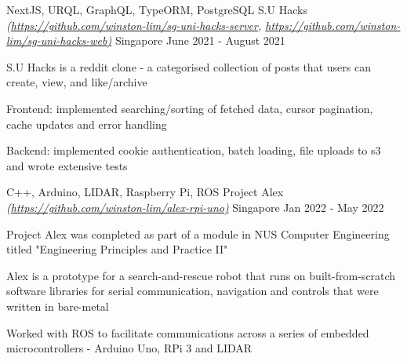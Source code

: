 

\begin{cventries}
  \cventry
  {NextJS, URQL, GraphQL, TypeORM, PostgreSQL} %
  {S.U Hacks \textmd{\em\tiny(\url{https://github.com/winston-lim/sg-uni-hacks-server}, \url{https://github.com/winston-lim/sg-uni-hacks-web)}}} %
  {Singapore} %
  {June 2021 - August 2021} %
  {
    \begin{cvitems}
      \item {S.U Hacks is a reddit clone - a categorised collection of posts that users can create, view, and like/archive }
      \item {Frontend: implemented searching/sorting of fetched data, cursor pagination, cache updates and error handling }
      \item {Backend: implemented cookie authentication, batch loading, file uploads to s3 and wrote extensive tests }
    \end{cvitems}
  }
  \cventry
  {C++, Arduino, LIDAR, Raspberry Pi, ROS} %
  {Project Alex  \textmd{\em\tiny(\url{https://github.com/winston-lim/alex-rpi-uno)}}} %
  {Singapore} %
  {Jan 2022 - May 2022} %
  {
    \begin{cvitems}
     \item {Project Alex was completed as part of a module in NUS Computer Engineering titled "Engineering Principles and Practice II"}
      \item {Alex is a prototype for a search-and-rescue robot that runs on built-from-scratch software libraries for serial communication, navigation and controls that were written in bare-metal}
       \item {Worked with ROS to facilitate communications across a series of embedded microcontrollers - Arduino Uno, RPi 3 and LIDAR}
    \end{cvitems}
  }

\end{cventries}